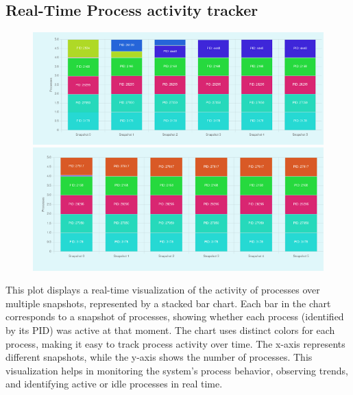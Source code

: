 \documentclass[12pt]{article}
\begin{document}
\subsection{Real-Time Process activity tracker}
\begin{figure}[H]
    \centering
    \begin{minipage}{0.45\textwidth}
        \centering
        \includegraphics[width=\textwidth]{logos and images/plot2_1.png}
    \end{minipage}
    \hfill
    \begin{minipage}{0.45\textwidth}
        \centering
        \includegraphics[width=\textwidth]{logos and images/plot2_2.png}
    \end{minipage}
    \caption{}
\end{figure}

This plot displays a real-time visualization of the activity of processes over multiple snapshots, represented by a stacked bar chart. Each bar in the chart corresponds to a snapshot of processes, showing whether each process (identified by its PID) was active at that moment. The chart uses distinct colors for each process, making it easy to track process activity over time. The x-axis represents different snapshots, while the y-axis shows the number of processes. This visualization helps in monitoring the system’s process behavior, observing trends, and identifying active or idle processes in real time.
\end{document}
